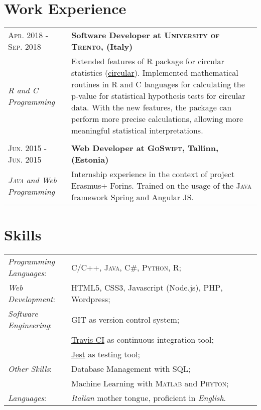 \documentclass[a4paper,10pt]{article}
\begin{document}
\section{Work Experience}
\begin{tabular}{m{0.25\linewidth}|p{0.75\linewidth}}
  \textsc{Apr. 2018 - Sep. 2018} &
    \textbf{Software Developer at \textsc{University of Trento}, (Italy)} \\
    \emph{R and C Programming} &
    Extended features of R package for circular statistics (\href{https://r-forge.r-project.org/projects/circular/}{circular}). Implemented mathematical routines in R and C languages for calculating the p-value for statistical hypothesis tests for circular data. With the new features, the package can perform more precise calculations, allowing more meaningful statistical interpretations.
    \\
  \multicolumn{2}{c}{} \\
  \textsc{Jun. 2015 - Jun. 2015} &
  \textbf{Web Developer at \textsc{GoSwift}, Tallinn, (Estonia)}\\
  \emph{\textsc{Java} and Web Programming} &
  Internship experience in the context of project Erasmus+ Forins. Trained on the usage of the \textsc{Java} framework Spring and Angular JS.
\end{tabular}

\section{Skills}
\begin{tabular}{m{0.25\linewidth} p{0.75\linewidth}}
\emph{Programming Languages}: & \textsc{C/C++, Java, C\#, Python, R};\\
\emph{Web Development}:       & HTML5, CSS3, Javascript (Node.js), \textsc{PHP}, Wordpress;\\
\emph{Software Engineering}: &\textsc{GIT} as version control system;\\
                     &\href{https://travis-ci.com/}{Travis CI} as continuous integration tool;\\ 
                     &\href{https://jestjs.io/en/}{Jest} as testing tool;\\
\emph{Other Skills}:         & Database Management with \textsc{SQL};\\
                     & Machine Learning with \textsc{Matlab} and \textsc{Phyton};\\
\emph{Languages}:            & \emph{Italian} mother tongue, proficient in \emph{English}.\\

\end{tabular}
\end{document}

